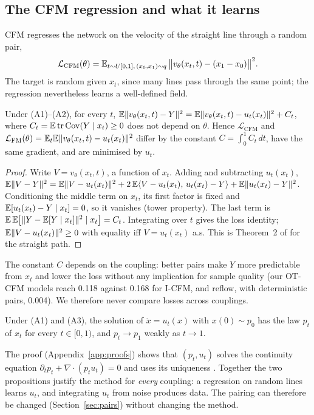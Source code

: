\subsection{The CFM regression and what it learns}\label{sec:cfm}
CFM regresses the network on the velocity of the straight line through a random pair,
\begin{equation}\label{eq:cfm}
\mathcal L_{\mathrm{CFM}}(\theta)=\mathbb{E}_{t\sim U[0,1],\,(x_0,x_1)\sim q}\,\big\|v_\theta(x_t,t)-(x_1-x_0)\big\|^2 .
\end{equation}
The target is random given $x_t$, since many lines pass through the same point; the regression nevertheless learns a well-defined field.
\begin{proposition}\label{prop:cfm}\label{prop:loss}
Under (A1)--(A2), for every $t$,
$\mathbb{E}\|v_\theta(x_t,t)-Y\|^2=\mathbb{E}\|v_\theta(x_t,t)-u_t(x_t)\|^2+C_t$, where $C_t=\mathbb{E}\operatorname{tr}\operatorname{Cov}(Y\mid x_t)\ge0$ does not depend on $\theta$. Hence $\mathcal L_{\mathrm{CFM}}$ and $\mathcal L_{\mathrm{FM}}(\theta)=\mathbb{E}_t\mathbb{E}\|v_\theta(x_t,t)-u_t(x_t)\|^2$ differ by the constant $C=\int_0^1C_t\,dt$, have the same gradient, and are minimised by $u_t$.
\end{proposition}
\begin{proof}
Write $V=v_\theta(x_t,t)$, a function of $x_t$. Adding and subtracting $u_t(x_t)$,
$\mathbb{E}\|V-Y\|^2=\mathbb{E}\|V-u_t(x_t)\|^2+2\,\mathbb{E}\langle V-u_t(x_t),\,u_t(x_t)-Y\rangle+\mathbb{E}\|u_t(x_t)-Y\|^2$.
Conditioning the middle term on $x_t$, its first factor is fixed and $\mathbb{E}[u_t(x_t)-Y\mid x_t]=0$, so it vanishes (tower property). The last term is $\mathbb{E}\,\mathbb{E}\big[\|Y-\mathbb{E}[Y\mid x_t]\|^2\mid x_t\big]=C_t$. Integrating over $t$ gives the loss identity; $\mathbb{E}\|V-u_t(x_t)\|^2\ge0$ with equality iff $V=u_t(x_t)$ a.s. This is Theorem~2 of \citet{lipman2023fm} for the straight path.
\end{proof}
The constant $C$ depends on the coupling: better pairs make $Y$ more predictable from $x_t$ and lower the loss without any implication for sample quality (our OT-CFM models reach 0.118 against 0.168 for I-CFM, and reflow, with deterministic pairs, 0.004). We therefore never compare losses across couplings.
\begin{proposition}\label{prop:transport}
Under (A1) and (A3), the solution of $\dot x=u_t(x)$ with $x(0)\sim p_0$ has the law $p_t$ of $x_t$ for every $t\in[0,1)$, and $p_t\to p_1$ weakly as $t\to1$.
\end{proposition}
The proof (Appendix~\ref{app:proofs}) shows that $(p_t,u_t)$ solves the continuity equation $\partial_tp_t+\nabla\cdot(p_tu_t)=0$ and uses its uniqueness \citep{villani2009ot}. Together the two propositions justify the method for \emph{every} coupling: a regression on random lines learns $u_t$, and integrating $u_t$ from noise produces data. The pairing can therefore be changed (Section~\ref{sec:pairs}) without changing the method.


